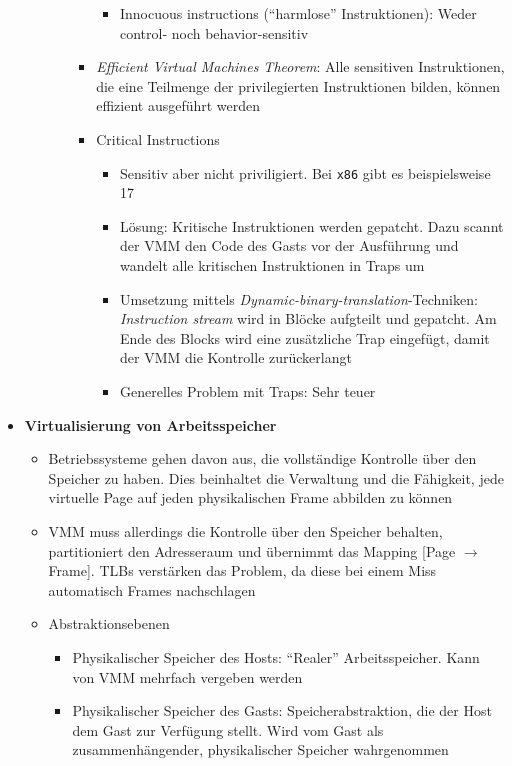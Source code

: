 \begin{itemize}
\begin{itemize}
\begin{itemize}
\begin{itemize}
\begin{itemize}
					\item Innocuous instructions ("`harmlose"' Instruktionen): Weder control- noch behavior-sensitiv
				\end{itemize}
				\item \textit{Efficient Virtual Machines Theorem}: Alle sensitiven Instruktionen, die eine Teilmenge der privilegierten Instruktionen bilden, können effizient ausgeführt werden
				\item Critical Instructions
				\begin{itemize}
					\item Sensitiv aber nicht priviligiert. Bei \texttt{x86} gibt es beispielsweise 17
					\item Lösung: Kritische Instruktionen werden gepatcht. Dazu scannt der VMM den Code des Gasts vor der Ausführung und wandelt alle kritischen Instruktionen in Traps um
					\item Umsetzung mittels \textit{Dynamic-binary-translation}-Techniken: \textit{Instruction stream} wird in Blöcke aufgteilt und gepatcht. Am Ende des Blocks wird eine zusätzliche Trap eingefügt, damit der VMM die Kontrolle zurückerlangt
					\item Generelles Problem mit Traps: Sehr teuer
				\end{itemize}
			\end{itemize}
		\end{itemize}
	\end{itemize}
	\item \textbf{Virtualisierung von Arbeitsspeicher}
	\begin{itemize}
		\item Betriebssysteme gehen davon aus, die vollständige Kontrolle über den Speicher zu haben. Dies beinhaltet die Verwaltung und die Fähigkeit, jede virtuelle Page auf jeden physikalischen Frame abbilden zu können
		\item VMM muss allerdings die Kontrolle über den Speicher behalten, partitioniert den Adresseraum und übernimmt das Mapping [Page \(\rightarrow\) Frame]. TLBs verstärken das Problem, da diese bei einem Miss automatisch Frames nachschlagen
		\item Abstraktionsebenen
		\begin{itemize}
			\item Physikalischer Speicher des Hosts: "`Realer"' Arbeitsspeicher. Kann von VMM mehrfach vergeben werden
			\item Physikalischer Speicher des Gasts: Speicherabstraktion, die der Host dem Gast zur Verfügung stellt. Wird vom Gast als zusammenhängender, physikalischer Speicher wahrgenommen

\end{itemize}
\end{itemize}
\end{itemize}
